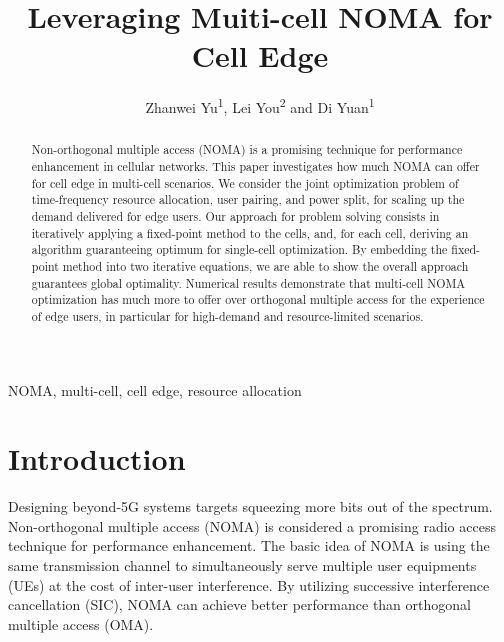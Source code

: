\documentclass[10pt,journal,final,finalsubmission,twocolumn]{IEEEtran}
\begin{document}
\title{Leveraging Muiti-cell NOMA for Cell Edge}

\author{Zhanwei Yu\textsuperscript{1}, Lei You\textsuperscript{2} and Di Yuan\textsuperscript{1}}
\renewcommand*{\Affilfont}{\small}

\maketitle
\begin{abstract}
Non-orthogonal multiple access (NOMA) is a promising 
technique for performance enhancement in cellular networks. This paper investigates how much NOMA can offer for cell edge in multi-cell scenarios. We consider the joint optimization problem of time-frequency resource allocation, user pairing, and power split, for scaling up the demand delivered for edge users. Our approach for problem solving consists in iteratively applying a fixed-point method to the cells, and, for each cell, deriving an algorithm guaranteeing optimum for single-cell optimization. By embedding the fixed-point method into two iterative equations, we are able to show the overall approach guarantees global optimality. Numerical results demonstrate that multi-cell NOMA optimization has much more to offer over orthogonal multiple access for the experience of edge users, in particular for high-demand and resource-limited scenarios. 
\end{abstract}


\begin{keywords}
NOMA, multi-cell, cell edge, resource allocation
\end{keywords}

\section{Introduction}  \label{Sec:Intro}

Designing beyond-5G systems targets squeezing more bits out of the spectrum. Non-orthogonal multiple access (NOMA) is considered a promising radio access technique for performance enhancement. The basic idea of NOMA is using the same transmission channel to simultaneously serve multiple user equipments (UEs) at the cost of inter-user interference. By utilizing successive interference cancellation (SIC), NOMA can achieve better performance than orthogonal multiple access (OMA).
\end{document}
